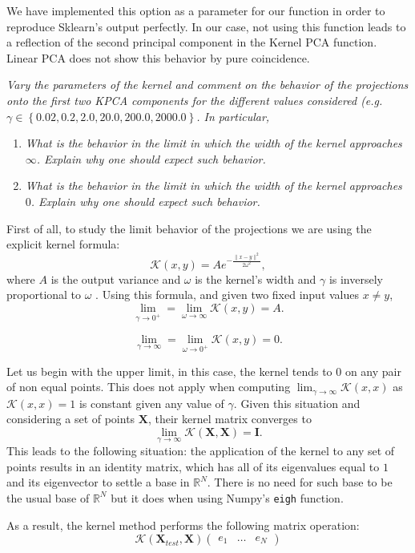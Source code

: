 \documentclass[11pt]{article}
\begin{document}
We have implemented this option as a parameter for our function in order to reproduce Sklearn's output perfectly. In our case, not using this function leads to a reflection of the second principal component in the Kernel PCA function. Linear PCA does not show this behavior by pure coincidence.

\emph{Vary the parameters of the kernel and comment on the behavior of the projections onto the first two KPCA components for the different values considered (e.g. $\gamma \in \left\{0.02, 0.2, 2.0, 20.0, 200.0, 2000.0\right\}$. In particular,}
\begin{enumerate}
    \item \emph{What is the behavior in the limit in which the width of the kernel approaches $\infty$. Explain why one should expect such behavior.}
    \item \emph{What is the behavior in the limit in which the width of the kernel approaches $0$. Explain why one should expect such behavior.}
\end{enumerate}

First of all, to study the limit behavior of the projections we are using the explicit kernel formula:
\[
     \mathcal{K}(x, y) = Ae^{-\frac{\|x-y\|^{2}}{2 \omega^2}},
\]
where \( A \) is the output variance and \( \omega \) is the kernel's width and \( \gamma \) is inversely proportional to \( \omega \) . Using this formula, and given two fixed input values \( x \neq y \),
\[
     \lim_{\gamma \to 0^{+}} = \lim_{\omega \to \infty} \mathcal{K}(x,y) = A.
\]

\[
     \lim_{\gamma \to \infty} = \lim_{\omega \to 0^{+}} \mathcal{K}(x,y) = 0.
\]

Let us begin with the upper limit, in this case, the kernel tends to \( 0 \) on any pair of non equal points. This does not apply when computing \( \lim_{\gamma \to \infty} \mathcal{K}(x,x) \) as \( \mathcal{K}(x,x) = 1 \) is constant given any value of \( \gamma \). Given this situation and considering a set of points \( \bm{X} \), their kernel matrix converges to
\[
      \lim_{\gamma \to \infty} \mathcal{K}(\bm{X}, \bm{X}) = \bm{I}.
\]
This leads to the following situation: the application of the kernel to any set of points results in an identity matrix, which has all of its eigenvalues equal to \( 1 \) and its eigenvector to settle a base in \( \mathbb{R}^N \). There is no need for such base to be the usual base of \( \mathbb{R}^N \) but it does when using Numpy's \texttt{eigh} function.

As a result, the kernel method performs the following matrix operation:
\[
      \mathcal{K}(\bm{X}_{test}, \bm{X})\begin{pmatrix} e_1 & \dots & e_N \end{pmatrix}
\]
\end{document}
